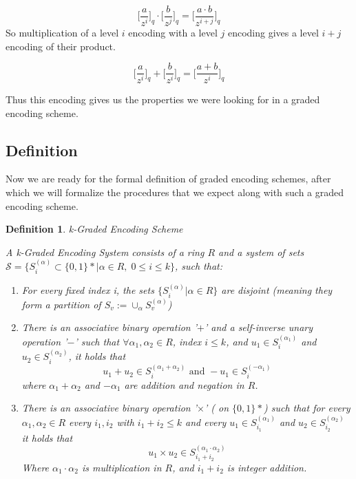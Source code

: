 \documentclass[12pt,twoside]{reedthesis}
\newtheorem{definition}{Definition}
\begin{document}
    \newcommand{\Encode}[2]{\bigg[ \frac{#2}{z^{#1}}\bigg]_q}
    $$
    \Encode{i}{a} \cdot \Encode{j}{b} = \Encode{i+j}{a \cdot b}
   $$
   So multiplication of a level $i$ encoding with a level $j$ encoding gives a level $i+j$ encoding of their product.
   
   
   $$\Encode{i}{a} + \Encode{i}{b} = \Encode{i}{a+b}$$
   
   Thus this encoding gives us the properties we were looking for in a graded encoding scheme. 
   \newcommand{\encode}[2]{\big[ \frac{#2}{z^{#1}}\big]_q}
   
   
   
   
   \subsection{Definition}
   
   \par Now we are ready for the formal definition of graded encoding schemes, after which we will formalize the procedures that we expect along with such a graded encoding scheme.
         
    \begin{definition}{k-Graded Encoding Scheme}
    \par A k-Graded Encoding System consists of a ring $R$ and a system of sets $\mathcal{S}= \{S_i^{(\alpha)} \subset \{0,1\}*| \alpha \in R, \; 0 \leq i \leq k \}$, such that:
    \begin{enumerate}
    \item For every fixed index i, the sets $\{S_i^{(\alpha)}| \alpha \in R \}$ are disjoint (meaning they form a partition of $S_v := \cup_\alpha S_v^{(\alpha)}$)
    
    \item There is an associative binary operation '$ + $' and a self-inverse unary operation '$-$' such that $\forall \alpha_1,\alpha_2 \in R$, index $i\leq k$, and $u_1 \in S_i^{(\alpha_1)}$ and $u_2 \in S_i^{(\alpha_2)}$, it holds that 
    $$u_1 + u_2 \in S_i^{(\alpha_1 + \alpha_2)} \text{ and } -u_1 \in S_i^{(-\alpha_1)}$$
    where $\alpha_1 + \alpha_2$ and $-\alpha_1$ are addition and negation in $R$.
    
    \item There is an associative binary operation '$\times$' ( on $\{ 0,1 \}*$) such that for every $\alpha_1,\alpha_2 \in R$ every $i_1,i_2$ with $i_1+i_2 \leq k$ and every $u_1 \in S_{i_1}^{(\alpha_1)}$ and $u_2 \in S_{i_2}^{(\alpha_2)}$ it holds that 
    $$u_1 \times u_2 \in S_{i_1 + i_2}^{(\alpha_1 \cdot \alpha_2)} $$
    Where $\alpha_1 \cdot \alpha_2$ is multiplication in $R$, and $i_1 + i_2$ is integer addition.
    \end{enumerate}
    \end{definition}
\end{document}
